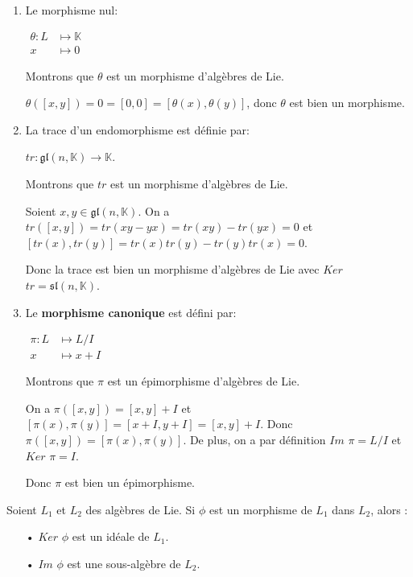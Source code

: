 \documentclass[a4paper,openany,12pt]{report}
\newcommand{\KK}{\mathbb{K}}
\newcommand{\gl}{\mathfrak{gl}}
\newcommand{\ssl}{\mathfrak{sl}}
\theoremstyle{break}
{\theorembodyfont{\upshape}
\newtheorem*{rmq}{Remarque :}
\newtheorem*{prv}{Preuve :}
\newtheorem*{ex}{Exemples :}
\newtheorem*{exe}{Exemple : }
\newtheorem*{nota}{Notation :}
\newtheorem*{dem}{D\'emonstration :}}
\begin{document}
\bigskip
\begin{ex}
\begin{enumerate}

\item Le morphisme nul:
\begin{center} 
$\begin{aligned} \theta: L & \longmapsto \KK \\ x & \longmapsto 0 \end{aligned}$
\end{center}
Montrons que $\theta$ est un morphisme d'algèbres de Lie.

$\theta([x,y]) = 0 = [0,0] = [\theta(x),\theta(y)]$, donc $\theta$ est bien un morphisme.

\item La trace d'un endomorphisme est définie par: 
\begin{center}
$tr: \gl(n,\KK) \longrightarrow \KK$.
\end{center}
Montrons que $tr$ est un morphisme d’algèbres de Lie.

Soient $x,y \in  \gl(n,\KK)$. On a $tr([x,y]) = tr(xy-yx) = tr(xy)-tr(yx) = 0$
et $[tr(x),tr(y)] = tr(x)tr(y)-tr(y)tr(x) = 0$.

Donc la trace est bien un morphisme d'algèbres de Lie avec $Ker$ $tr = \ssl(n,\KK)$.

\item Le \textbf{morphisme canonique} est défini par:  
\begin{center}
$\begin{aligned} \pi: L & \longmapsto L/I \\ x & \longmapsto x+I\end{aligned}$
\end{center}
Montrons que $\pi$ est un épimorphisme d'algèbres de Lie.

On a $\pi([x,y]) = [x,y]+I$ et $[\pi(x),\pi(y)] = [x+I,y+I] = [x,y]+I$. Donc $\pi([x,y]) = [\pi(x),\pi(y)]$. De plus, on a par définition $Im$ $\pi = L/I$ et $Ker$ $\pi = I$.

Donc $\pi$ est bien un épimorphisme.
\end{enumerate}
\end{ex}

\begin{rmq}
\quad Soient $L_{1}$ et $L_{2}$ des algèbres de Lie. Si $\phi$ est un morphisme de $L_{1}$ dans $L_{2}$, alors :
\begin{itemize}
\item[•] $Ker$ $\phi$ est un idéale de $L_{1}$.
\item[•] $Im$ $\phi$ est une sous-algèbre de $L_{2}$.
\end{itemize}
\end{rmq}
\end{document}
